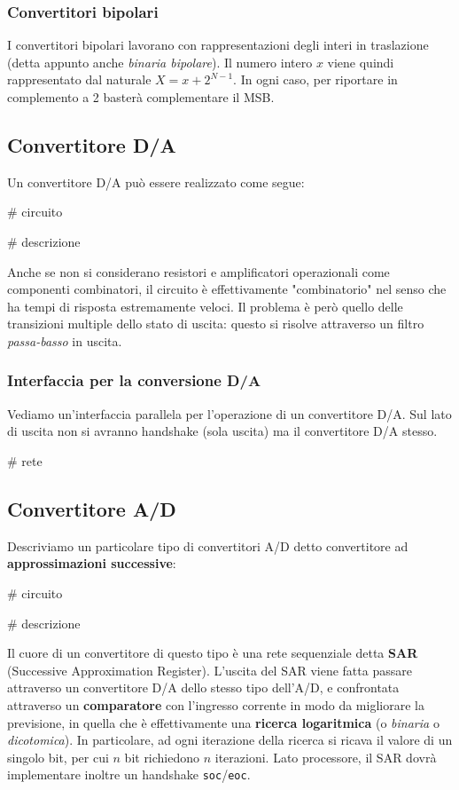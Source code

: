 \documentclass[a4paper,11pt]{article}
\begin{document}
\subsubsection{Convertitori bipolari}
I convertitori bipolari lavorano con rappresentazioni degli interi in traslazione (detta appunto anche \textit{binaria bipolare}).
Il numero intero $x$ viene quindi rappresentato dal naturale $X = x + 2^{N-1}$.
In ogni caso, per riportare in complemento a 2 basterà complementare il MSB.


\subsection{Convertitore D/A}
Un convertitore D/A può essere realizzato come segue:

# circuito

# descrizione

\par\smallskip

Anche se non si considerano resistori e amplificatori operazionali come componenti combinatori, il circuito è effettivamente "combinatorio" nel senso che ha tempi di risposta estremamente veloci.
Il problema è però quello delle transizioni multiple dello stato di uscita: questo si risolve attraverso un filtro \textit{passa-basso} in uscita.

\subsubsection{Interfaccia per la conversione D/A}
Vediamo un'interfaccia parallela per l'operazione di un convertitore D/A.
Sul lato di uscita non si avranno handshake (sola uscita) ma il convertitore D/A stesso.

# rete

\subsection{Convertitore A/D}
Descriviamo un particolare tipo di convertitori A/D detto convertitore ad \textbf{approssimazioni successive}:

# circuito

# descrizione

Il cuore di un convertitore di questo tipo è una rete sequenziale detta \textbf{SAR} (Successive Approximation Register).
L'uscita del SAR viene fatta passare attraverso un convertitore D/A dello stesso tipo dell'A/D, e confrontata attraverso un \textbf{comparatore} con l'ingresso corrente in modo da migliorare la previsione, in quella che è effettivamente una \textbf{ricerca logaritmica} (o \textit{binaria} o \textit{dicotomica}).
In particolare, ad ogni iterazione della ricerca si ricava il valore di un singolo bit, per cui $n$ bit richiedono $n$ iterazioni.
Lato processore, il SAR dovrà implementare inoltre un handshake \lstinline|soc|/\lstinline|eoc|.
\end{document}
